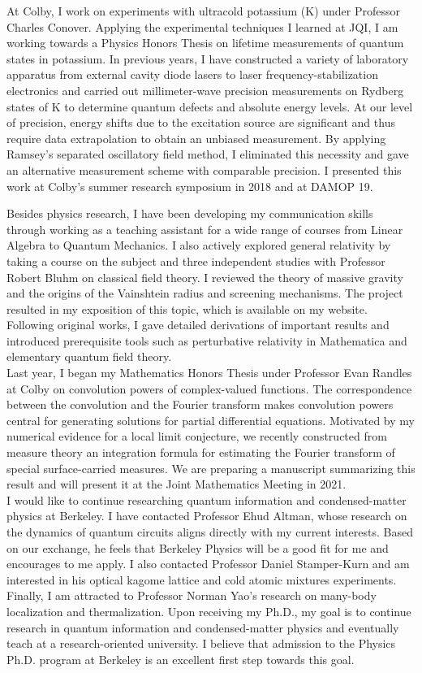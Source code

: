 \documentclass[12pt]{article}
\begin{document}
At Colby, I work on experiments with ultracold potassium (K) under Professor Charles Conover. Applying the experimental techniques I learned at JQI, I am working towards a Physics Honors Thesis on lifetime measurements of quantum states in potassium. In previous years, I have constructed a variety of laboratory apparatus from external cavity diode lasers to laser frequency-stabilization electronics and carried out millimeter-wave precision measurements on Rydberg states of K to determine quantum defects and absolute energy levels. At our level of precision, energy shifts due to the excitation source are significant and thus require data extrapolation to obtain an unbiased measurement. By applying Ramsey's separated oscillatory field method, I eliminated this necessity and gave an alternative measurement scheme with comparable precision. I presented this work at Colby's summer research symposium in 2018 and at DAMOP 19. 

Besides physics research, I have been developing my communication skills through working as a teaching assistant for a wide range of courses from Linear Algebra to Quantum Mechanics. I also actively explored general relativity by taking a course on the subject and three independent studies with Professor Robert Bluhm on classical field theory. I reviewed the theory of massive gravity and the origins of the Vainshtein radius and screening mechanisms. The project resulted in my exposition of this topic, which is available on my website. Following original works, I gave detailed derivations of important results and introduced prerequisite tools such as perturbative relativity in Mathematica and elementary quantum field theory. \\ 

Last year, I began my Mathematics Honors Thesis under Professor Evan Randles at Colby on convolution powers of complex-valued functions. The correspondence between the convolution and the Fourier transform makes convolution powers central for generating solutions for partial differential equations. Motivated by my numerical evidence for a local limit conjecture, we recently constructed from measure theory an integration formula for estimating the Fourier transform of special surface-carried measures. We are preparing a manuscript summarizing this result and will present it at the Joint Mathematics Meeting in 2021. \\ 

I would like to continue researching quantum information and condensed-matter physics at Berkeley. I have contacted Professor Ehud Altman, whose research on the dynamics of quantum circuits aligns directly with my current interests. Based on our exchange, he feels that Berkeley Physics will be a good fit for me and encourages to me apply. I also contacted Professor Daniel Stamper-Kurn and am interested in his optical kagome lattice and cold atomic mixtures experiments. Finally, I am attracted to Professor Norman Yao's research on many-body localization and thermalization. Upon receiving my Ph.D., my goal is to continue research in quantum information and condensed-matter physics and eventually teach at a research-oriented university. I believe that admission to the Physics Ph.D. program at Berkeley is an excellent first step towards this goal.  
\end{document}
